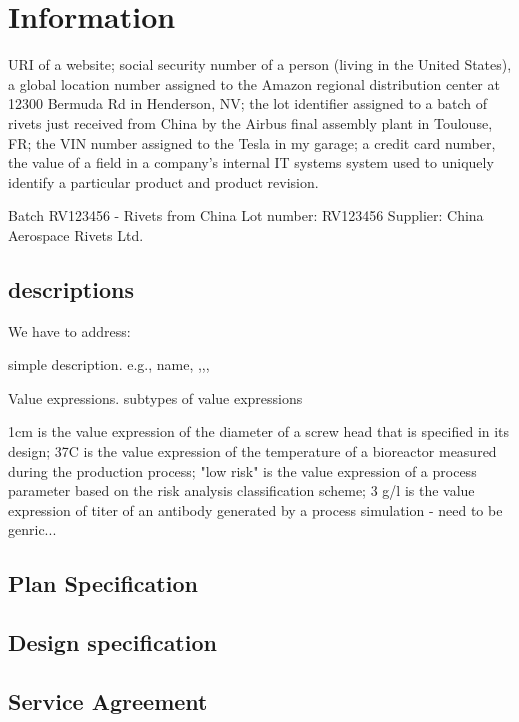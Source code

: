 \chapter{Information}



URI of a website; social security number of a person (living in the United States), a global location number assigned to the Amazon regional distribution center at 12300 Bermuda Rd in Henderson, NV; the lot identifier assigned to a batch of rivets just received from China by the Airbus final assembly plant in Toulouse, FR; the VIN number assigned to the Tesla in my garage; a credit card number, the value of a field in a company's internal IT systems system used to uniquely identify a particular product and product revision.

Batch RV123456 - Rivets from China Lot number: RV123456
Supplier: China Aerospace Rivets Ltd. 

\section{descriptions}

We have to address:

simple description. e.g., name, ,,,

Value expressions. subtypes of value expressions

1cm is the value expression of the diameter of a screw head that is specified in its design; 37C is the value expression of the temperature of a bioreactor measured during the production process; "low risk" is the value expression of a process parameter based on the risk analysis classification scheme; 3 g/l is the value expression of titer of an antibody generated by a process simulation - need to be genric...


\section{Plan Specification}



\section{Design specification}



\section{Service Agreement}